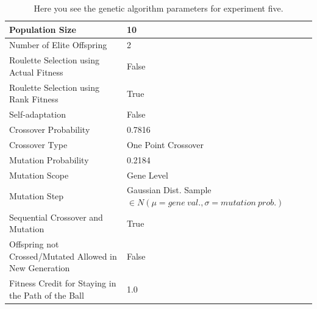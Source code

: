 \documentclass[a4paper,10pt]{article}
\begin{document}
\begin{table}[H]
\centering
\footnotesize
\begin{tabular}{ |>{\columncolor[gray]{0.8}} l | l| }
\hline
Population Size                                                      & 10                                                                             \\ \hline
Number of Elite Offspring                                            & 2                                                                              \\ \hline
Roulette Selection using Actual Fitness                              & False                                                                          \\ \hline
Roulette Selection using Rank Fitness                                & True                                                                           \\ \hline
Self-adaptation                                                      & False                                                                          \\ \hline
Crossover Probability                                                & 0.7816                                                                         \\ \hline
Crossover Type                                                       & One Point Crossover                                                            \\ \hline
Mutation Probability                                                 & 0.2184                                                                         \\ \hline
Mutation Scope                                                       & Gene Level                                                                     \\ \hline
Mutation Step                                                        & Gaussian Dist. Sample $\in N(\mu=gene \ val., \sigma = mutation \ prob.)$      \\ \hline
Sequential Crossover and Mutation                                    & True                                                      	                    \\ \hline
Offspring not Crossed/Mutated Allowed in New Generation              & False                                                     	                    \\ \hline
Fitness Credit for Staying in the Path of the Ball                   & 1.0                                                      	                    \\ \hline
\end{tabular}
\caption{Here you see the genetic algorithm parameters for experiment five.}
\label{tab:exp5}
\end{table}
\end{document}
